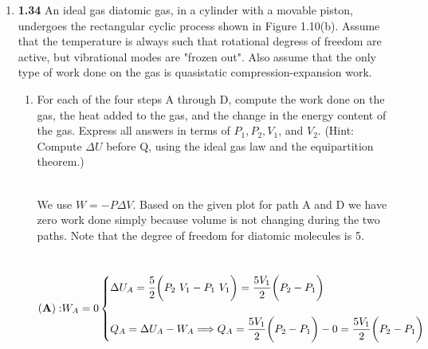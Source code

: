 \documentclass[fleqn]{article}
\begin{document}
\begin{enumerate}
    \item \textbf{1.34} An ideal gas diatomic gas, in a cylinder with a movable piston, undergoes the rectangular cyclic process
    shown in Figure 1.10(b). Assume that the temperature is always such that rotational degress of freedom are active, but vibrational
    modes are "frozen out". Also assume that the only type of work done on the gas is quasistatic compression-expansion work.
    \begin{enumerate}
      \item For each of the four steps A through D, compute the work done on the gas, the heat added to the gas, and the change in the energy
      content of the gas. Express all answers in terms of $P_1, P_2, V_1$, and $V_2$. (Hint: Compute $\Delta U$ before Q, using
      the ideal gas law and the equipartition theorem.)

        \textcolor{hwColor}{
          \\
          We use $W=-P \Delta V$. Based on the given plot for path A and D we have zero work done simply because volume 
          is not changing during the two paths. Note that the degree of freedom for diatomic molecules is 5.
          \\
          \\
          \\
          $
            \mathbf{(A):}
            \\
            \\
            W_A=0
            \\
            \\
            \begin{cases}
              \Delta U_A=\dfrac{5}{2} \bigg( P_2 ~ V_1 -P_1 ~ V_1\bigg)=\dfrac{5 V_1}{2} \bigg( P_2-P_1\bigg)
              \\
              \\
              Q_A=\Delta U_A-W_A \Longrightarrow Q_A=\dfrac{5 V_1}{2} \bigg( P_2-P_1\bigg)-0=\dfrac{5 V_1}{2} \bigg( P_2-P_1\bigg)
            \end{cases}
            \\
            \\
            \\ 
          $
        }


\end{enumerate}
\end{enumerate}
\end{document}
